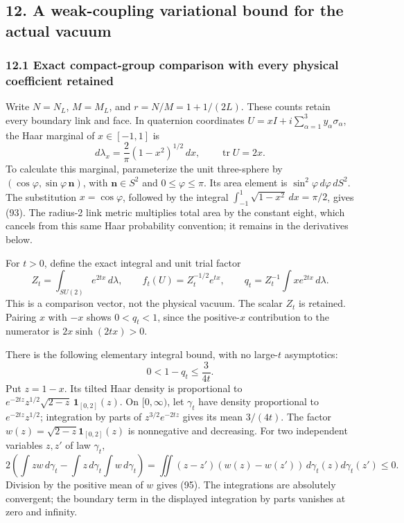 \documentclass[
  11pt,
]{article}
\begin{document}
\subsection{12. A weak-coupling variational bound for the actual
vacuum}\label{a-weak-coupling-variational-bound-for-the-actual-vacuum}

\subsubsection{12.1 Exact compact-group comparison with every physical
coefficient
retained}\label{exact-compact-group-comparison-with-every-physical-coefficient-retained}

Write \(N=N_L\), \(M=M_L\), and \(r=N/M=1+1/(2L)\). These counts retain
every boundary link and face. In quaternion coordinates
\(U=xI+i\sum_{\alpha=1}^3y_\alpha\sigma_\alpha\), the Haar marginal of
\(x\in[-1,1]\) is \[
 d\lambda_x=\frac2\pi(1-x^2)^{1/2}\,dx,\qquad
 \operatorname{tr}U=2x.
 \tag{93}
\] To calculate this marginal, parameterize the unit three-sphere by
\((\cos\varphi,\sin\varphi\,\mathbf n)\), with \(\mathbf n\in S^2\) and
\(0\le\varphi\le\pi\). Its area element is
\(\sin^2\varphi\,d\varphi\,dS^2\). The substitution \(x=\cos\varphi\),
followed by the integral \(\int_{-1}^1\sqrt{1-x^2}\,dx=\pi/2\), gives
(93). The radius-2 link metric multiplies total area by the constant
eight, which cancels from this same Haar probability convention; it
remains in the derivatives below.

For \(t>0\), define the exact integral and unit trial factor \[
 Z_t=\int_{SU(2)}e^{2tx}\,d\lambda,\qquad
 f_t(U)=Z_t^{-1/2}e^{tx},\qquad
 q_t=Z_t^{-1}\int x e^{2tx}\,d\lambda .
 \tag{94}
\] This is a comparison vector, not the physical vacuum. The scalar
\(Z_t\) is retained. Pairing \(x\) with \(-x\) shows \(0<q_t<1\), since
the positive-\(x\) contribution to the numerator is \(2x\sinh(2tx)>0\).

There is the following elementary integral bound, with no large-\(t\)
asymptotics: \[
 0<1-q_t\le\frac{3}{4t}.
 \tag{95}
\] Put \(z=1-x\). Its tilted Haar density is proportional to
\(e^{-2tz}z^{1/2}\sqrt{2-z}\,\mathbf1_{[0,2]}(z)\). On \([0,\infty)\),
let \(\gamma_t\) have density proportional to \(e^{-2tz}z^{1/2}\);
integration by parts of \(z^{3/2}e^{-2tz}\) gives its mean \(3/(4t)\).
The factor \(w(z)=\sqrt{2-z}\mathbf1_{[0,2]}(z)\) is nonnegative and
decreasing. For two independent variables \(z,z'\) of law \(\gamma_t\),
\[
 2\left(\int zw\,d\gamma_t-\int z\,d\gamma_t\int w\,d\gamma_t\right)
 =\iint(z-z')(w(z)-w(z'))\,d\gamma_t(z)d\gamma_t(z')\le0 .
\] Division by the positive mean of \(w\) gives (95). The integrations
are absolutely convergent; the boundary term in the displayed
integration by parts vanishes at zero and infinity.
\end{document}
